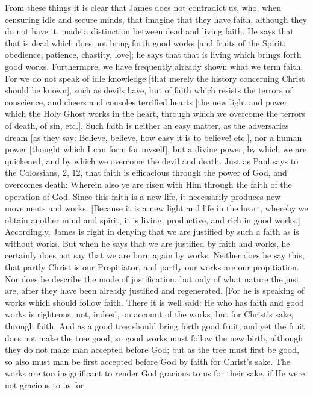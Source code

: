 From these things it is clear that James does not contradict us, who,
when censuring idle and secure minds, that imagine that they have
faith, although they do not have it, made a distinction between dead
and living faith.  He says that that is dead which does not bring
forth good works [and fruits of the Spirit: obedience, patience,
chastity, love]; he says that that is living which brings forth good
works.  Furthermore, we have frequently already shown what we term
faith.  For we do not speak of idle knowledge [that merely the
history concerning Christ should be known], such as devils have, but
of faith which resists the terrors of conscience, and cheers and
consoles terrified hearts [the new light and power which the Holy
Ghost works in the heart, through which we overcome the terrors of
death, of sin, etc.].  Such faith is neither an easy matter, as the
adversaries dream [as they say: Believe, believe, how easy it is to
believe! etc.], nor a human power [thought which I can form for
myself], but a divine power, by which we are quickened, and by which
we overcome the devil and death.  Just as Paul says to the Colossians,
2, 12, that faith is efficacious through the power of God, and
overcomes death: Wherein also ye are risen with Him through the faith
of the operation of God.  Since this faith is a new life, it
necessarily produces new movements and works.  [Because it is a new
light and life in the heart, whereby we obtain another mind and
spirit, it is living, productive, and rich in good works.]
Accordingly, James is right in denying that we are justified by such
a faith as is without works.  But when he says that we are justified
by faith and works, he certainly does not say that we are born again
by works.  Neither does he say this, that partly Christ is our
Propitiator, and partly our works are our propitiation.  Nor does he
describe the mode of justification, but only of what nature the just
are, after they have been already justified and regenerated.  [For he
is speaking of works which should follow faith.  There it is well
said: He who has faith and good works is righteous; not, indeed, on
account of the works, but for Christ's sake, through faith.  And as a
good tree should bring forth good fruit, and yet the fruit does not
make the tree good, so good works must follow the new birth, although
they do not make man accepted before God; but as the tree must first
be good, so also must man be first accepted before God by faith for
Christ's sake.  The works are too insignificant to render God
gracious to us for their sake, if He were not gracious to us for
